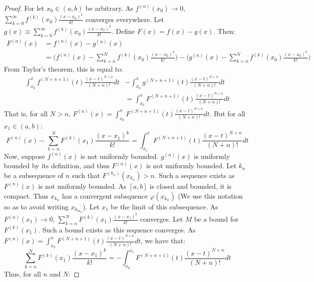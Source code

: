 \documentclass[crop=false,class=book,oneside]{standalone}
\begin{document}
        \begin{proof}
        For let $x_0\in (a,b)$ be arbitrary. As $f^{(n)}(x_0)\rightarrow 0$, $\sum_{k=0}^{\infty} f^{(k)}(x_0)\frac{(x-x_0)^{k}}{k!}$ converges everywhere. Let $g(x)\equiv \sum_{k=0}^{\infty} f^{(k)}(x_0)\frac{(x-x_0)^{k}}{k!}$. Define $F(x) = f(x)-g(x)$. Then:
        \begin{align*}
            F^{(n)}(x) &= f^{(n)}(x)-g^{(n)}(x)\\
            &= \bigg(f^{(n)}(x)-\sum_{k=n}^{N} f^{(k)}(x_0)\frac{(x-x_0)^{k}}{k!}\bigg)-\bigg(g^{(n)}(x)-\sum_{k=n}^{N} f^{(k)}(x_0)\frac{(x-x_0)^{k}}{k!}\bigg)    
        \end{align*}
        From Taylor's theorem, this is equal to:
        \begin{align*}
            \int_{x_0}^{x} f^{(N+n+1)}(t)\frac{(x-t)^{N+n}}{(N+n)!}dt &- \int_{x_0}^{x} g^{(N+n+1)}(t)\frac{(x-t)^{N+n}}{(N+n)!}dt\\
            &= \int_{x_0}^{x} F^{(N+n+1)}(t)\frac{(x-t)^{N+n}}{(N+n)!}dt    
        \end{align*}
        That is, for all $N>n$, $F^{(n)}(x) = \int_{x_0}^{x} F^{(N+n+1)}(t)\frac{(x-t)^{N+n}}{(N+n)!}dt$. But for all $x_1 \in (a,b)$:
        \begin{equation*}
            F^{(n)}(x)-\sum_{k=n}^{N} F^{(k)}(x_1)\frac{(x-x_1)^k}{k!} = \int_{x_1}^{x} F^{(N+n+1)}(t)\frac{(x-t)^{N+n}}{(N+n)!}dt    
        \end{equation*}
        Now, suppose $f^{(n)}(x)$ is not uniformly bounded. $g^{(n)}(x)$ is uniformly bounded by its definition, and thus $F^{(n)}(x)$ is not uniformly bounded. Let ${k_n}$ be a subsequence of $n$ such that $F^{(k_n)}(x_{k_n})>n$. Such a sequence exists as $F^{(n)}(x)$ is not uniformly bounded. As $[a,b]$ is closed and bounded, it is compact. Thus $x_{k_n}$ has a convergent subsquence $\varphi(x_{k_n})$ (We use this notation so as to avoid writing $x_{k_{m_n}}$). Let $x_1$ be the limit of this subsequence. As $F^{(n)}(x_1)\rightarrow 0$, $\sum_{k=n}^{N} F^{(k)}(x_1)\frac{(x-x_1)^k}{k!}$ converges. Let $M$ be a bound for $F^{(k)}(x_1)$. Such a bound exists as this sequence converges. As $F^{(n)}(x) = \int_{x_0}^{x} F^{(N+n+1)}(t)\frac{(x-t)^{N+n}}{(N+n)!}dt$, we have that:
        \begin{equation*}
            \sum_{k=n}^{N} F^{(k)}(x_1)\frac{(x-x_1)^k}{k!} = -\int_{x_0}^{x_1} F^{(N+n+1)}(t)\frac{(x-t)^{N+n}}{(N+n)!}dt    
        \end{equation*}
        Thus, for all $n$ and $N$:

\end{proof}
\end{document}
